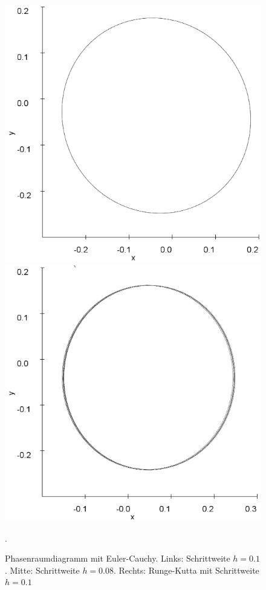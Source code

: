 \documentclass{scrartcl}
\begin{document}
\begin{figure}
\includegraphics[scale=0.28]{duffing-awp1-500k-nach-500k-h0,08-euler}
\includegraphics[scale=0.28]{duffing-awp1-500k-nach-500k-h0,1-runge}
\caption{Phasenraumdiagramm mit Euler-Cauchy. Links: Schrittweite $h=0.1$. Mitte: Schrittweite $h=0.08$. Rechts: Runge-Kutta mit Schrittweite $h=0.1$}. 
\label{fig:duffing-awp1}
\end{figure}
\end{document}
